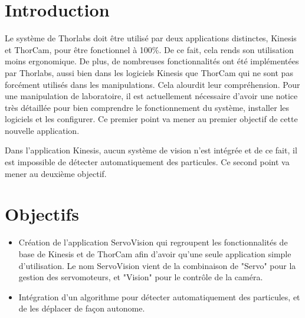 \section{Introduction}

Le système de Thorlabs doit être utilisé par deux applications distinctes, Kinesis et ThorCam, pour être fonctionnel à 100\%. De ce fait, cela rends son utilisation moins ergonomique. De plus, de nombreuses fonctionnalités ont été implémentées par Thorlabs, aussi bien dans les logiciels Kinesis que ThorCam qui ne sont pas forcément utilisés dans les manipulations. Cela alourdit leur compréhension. Pour une manipulation de laboratoire, il est actuellement nécessaire d'avoir une notice très détaillée pour bien comprendre le fonctionnement du système, installer les logiciels et les configurer. Ce premier point va mener au premier objectif de cette nouvelle application.

Dans l'application Kinesis, aucun système de vision n'est intégrée et de ce fait, il est impossible de détecter automatiquement des particules. Ce second point va mener au deuxième objectif.

\section{Objectifs}
\begin{itemize}[label=\textbullet]
    \item Création de l'application ServoVision qui regroupent les fonctionnalités de base de Kinesis et de ThorCam afin d'avoir qu'une seule application simple d'utilisation. Le nom ServoVision vient de la combinaison de "Servo" pour la gestion des servomoteurs, et "Vision" pour le contrôle de la caméra.
    \item Intégration d'un algorithme pour détecter automatiquement des particules, et de les déplacer de façon autonome.
\end{itemize}

